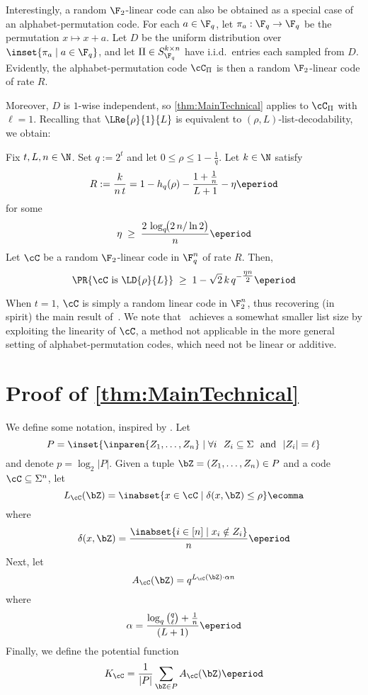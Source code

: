\documentclass[11pt]{article}
\begin{document}
Interestingly, a random $\F_2$-linear code can also be obtained as a special case of an alphabet-permutation code. For each $a \in \F_q$, let $\pi_a:\F_q \to \F_q$ be the permutation $x \mapsto x+a$. Let $D$ be the uniform distribution over $\inset{\pi_a \mid a \in \F_q}$, and let $\Pi \in S_{\F_q}^{k\times n}$ have i.i.d.\ entries each sampled from $D$. Evidently, the alphabet-permutation code $\cC_\Pi$ is then a random $\F_2$-linear code of rate $R$.

Moreover, $D$ is $1$-wise independent, so \cref{thm:MainTechnical} applies to $\cC_\Pi$ with $\ell=1$. Recalling that $\LRe{\rho}{1}{L}$ is equivalent to $(\rho,L)$-list-decodability, we obtain:

\begin{corollary}\label{cor:linear}
Fix $t, L, n \in \N$. Set $q := 2^t$ and let $0 \le \rho \le 1 - \tfrac{1}{q}$. Let $k \in \N$ satisfy
$$
R := \frac{k}{n\,t} 
= 1 - h_q(\rho) - \frac{1 + \tfrac{1}{n}}{L+1} - \eta\eperiod
$$
for some 
$$
\eta \;\ge\; \frac{2\,\log_q\!\bigl(2\,n/\ln 2\bigr)}{n}\eperiod
$$
Let $\cC$ be a random $\F_2$-linear code in $\F_q^n$ of rate $R$. Then,
$$
\PR{\cC \text{ is } \LD{\rho}{L}}
\;\ge\;
1 - \sqrt{2}\,k \,q^{-\tfrac{\eta n}{2}}\eperiod
$$
\end{corollary}

When $t=1$, $\cC$ is simply a random linear code in $\F_2^n$, thus recovering (in spirit) the main result of~\cite{LW2021}. We note that~\cite{LW2021} achieves a somewhat smaller list size by exploiting the linearity of $\cC$, a method not applicable in the more general setting of alphabet-permutation codes, which need not be linear or additive.









\section{Proof of \cref{thm:MainTechnical}}\label{sec:ProofMain}
We define some notation, inspired by \cite{GHS+2002,LW2021}. Let $$P = \inset{\inparen{Z_1,\dots, Z_n}\mid \forall i ~~Z_i\subseteq \Sigma~\textrm{ and }~ |Z_i| = \ell}$$
and denote $p = \log_2 |P|$. 
Given a tuple $\bZ = (Z_1,\dots,Z_n)\in P$ and a code $\cC\subseteq \Sigma^n$, let 
$$L_\cC(\bZ) = \inabset{x\in \cC \mid \delta(x,\bZ)\le \rho}\ecomma$$
where
$$\delta(x,\bZ) = \frac{\inabset{i\in [n] \mid x_i\notin Z_i}}n\eperiod$$
Next, let
$$
A_\cC(\bZ) = q^{L_\cC(\bZ)\cdot \alpha n}
$$
where 
$$
\alpha = \frac {\log_q\binom q \ell+\frac 1n} {(L+1)}\eperiod
$$
Finally, we define the potential function
$$
K_\cC = \frac{1}{|P|}\sum_{\bZ\in P}A_\cC(\bZ)\eperiod
$$
\end{document}
